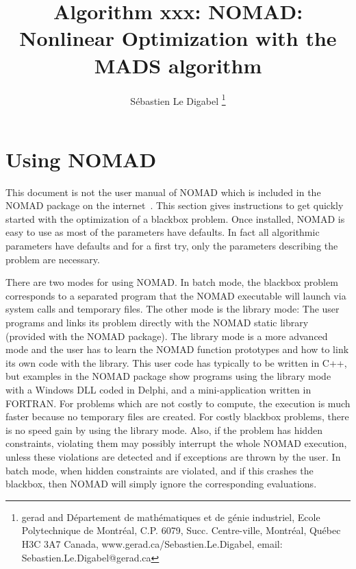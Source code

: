 \documentclass[12pt,english]{article}
\title{
    Algorithm xxx: NOMAD: Nonlinear Optimization with the MADS algorithm
}
\author{
  S\'ebastien Le Digabel
  \thanks{{\sc gerad}
          and D\'epartement de math\'ematiques et de g\'enie industriel,
          Ecole Polytechnique de Montr\'eal,
          C.P. 6079, Succ. Centre-ville,
          Montr\'eal, Qu\'ebec H3C 3A7 Canada,
          www.gerad.ca/Sebastien.Le.Digabel,
          email: Sebastien.Le.Digabel@gerad.ca}
}
\newcommand{\nomad}{NOMAD\xspace}
\newcommand{\bb}{blackbox\xspace}
\begin{document}
\setcounter{page}{0}

\label{sec-front}

\thispagestyle{empty}
\maketitle
\thispagestyle{empty}

\section*{Using \nomad}
\label{sec-use}

This document is not the user manual of \nomad which
 is included in the \nomad package on the internet~\cite{Le09a}.
This section gives instructions to get quickly started with the optimization of
     a \bb problem.
Once installed, \nomad is easy to use as most of the parameters
  have defaults. In fact all algorithmic parameters have defaults
  and for a first try, only the parameters describing the problem
  are necessary.

 There are two modes for using \nomad.
 In batch mode, the \bb problem corresponds to a separated program
 that the \nomad executable will launch via system calls and temporary files.
 The other mode is the library mode: The user programs and links its problem
   directly with the \nomad static library
   (provided with the \nomad package).
 The library mode is a more advanced mode and the user has to learn the
   \nomad function prototypes and how to link its own code with the library.
This user code has typically to be written in C++,
  but examples in the \nomad package show
  programs using the library mode with a Windows DLL coded in Delphi,
  and a mini-application written in FORTRAN.
For problems which are not costly to compute,
 the execution is much faster because no temporary files are created.
For costly \bb problems, there is no speed gain by using the library mode.
Also, if the problem has hidden constraints,
   violating them may possibly interrupt the whole \nomad execution,
   unless these violations are detected and if
   exceptions are thrown by the user.
 In batch mode, when hidden constraints are violated, and if this crashes the \bb,
   then \nomad will simply ignore the corresponding evaluations.
\end{document}
